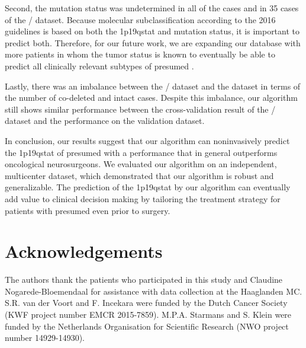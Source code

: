 Second, the  mutation status was undetermined in all of the  cases and in 35 cases of the / dataset.
Because molecular subclassification according to the  2016 guidelines is based on both the \acl{1p19qstat} and  mutation status, it is important to predict both.
Therefore, for our future work, we are expanding our database with more patients in whom the \gls{tumor}  status is known to eventually be able to predict all clinically relevant subtypes of presumed .

Lastly, there was an imbalance between the / dataset and the  dataset in terms of the number of co-deleted and intact cases.
Despite this imbalance, our algorithm still shows similar performance between the cross-validation result of the / dataset and the performance on the  validation dataset.

In conclusion, our results suggest that our algorithm can noninvasively predict the \acl{1p19qstat} of presumed  with a performance that in general outperforms oncological neurosurgeons.
We evaluated our algorithm on an independent, multicenter dataset, which demonstrated that our algorithm is robust and generalizable.
The prediction of the \acl{1p19qstat} by our algorithm can eventually add value to clinical decision making by tailoring the treatment strategy for patients with presumed  even prior to surgery.

\section*{Acknowledgements}

The authors thank the patients who participated in this study and Claudine Nogarede-Bloemendaal for assistance with data collection at the Haaglanden MC\@.
S.R. van der Voort and F. Incekara were funded by the Dutch Cancer Society (KWF project number EMCR 2015-7859).
M.P.A. Starmans and S. Klein were funded by the Netherlands Organisation for Scientific Research (NWO project number 14929-14930).

